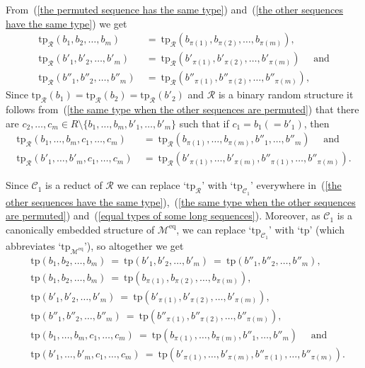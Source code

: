 \documentclass[11pt, twoside]{amsart}
\numberwithin{equation}{section}
\newcommand{\tp}{\mathrm{tp}}
\newcommand{\meq}{^{\mathrm{eq}}}
\newcommand{\mcC}{\mathcal{C}}
\newcommand{\mcM}{\mathcal{M}}
\newcommand{\mcR}{\mathcal{R}}
\begin{document}
\noindent
From~(\ref{the permuted sequence has the same type}) and~(\ref{the other sequences have the same type})
we get
\begin{align}\label{the same type when the other sequences are permuted}
\tp_\mcR(b_1, b_2, \ldots, b_m) \ &= \ \tp_\mcR(b_{\pi(1)}, b_{\pi(2)}, \ldots, b_{\pi(m)}),  \\
\tp_\mcR(b'_1, b'_2, \ldots, b'_m) \ &= \ \tp_\mcR(b'_{\pi(1)}, b'_{\pi(2)}, \ldots, b'_{\pi(m)}) \quad \text{ and} \nonumber \\
\tp_\mcR(b''_1, b''_2, \ldots, b''_m) \ &= \ \tp_\mcR(b''_{\pi(1)}, b''_{\pi(2)}, \ldots, b''_{\pi(m)}), \nonumber
\end{align}
Since $\tp_\mcR(b_1) = \tp_\mcR(b_2) = \tp_\mcR(b'_2)$ and $\mcR$ is a binary random structure it follows 
from~(\ref{the same type when the other sequences are permuted}) that there are
$c_2, \ldots, c_m \in R \setminus \{b_1, \ldots, b_m, b'_1, \ldots, b'_m\}$ such that if $c_1 = b_1 (= b'_1)$,
then
\begin{align}\label{equal types of some long sequences}
\tp_\mcR(b_1, \ldots, b_m,  c_1, \ldots, c_m)  \ &= \ \tp_\mcR(b_{\pi(1)}, \ldots, b_{\pi(m)},  b''_1, \ldots, b''_m)
\quad \text{ and} \\
\tp_\mcR(b'_1, \ldots, b'_m, c_1, \ldots, c_m) \ &= \ \tp_\mcR(b'_{\pi(1)}, \ldots, b'_{\pi(m)}, b''_{\pi(1)}, \ldots, b''_{\pi(m)}).
\nonumber
\end{align}


\noindent
Since $\mcC_1$ is a reduct of $\mcR$ we can replace `$\tp_\mcR$' with `$\tp_{\mcC_1}$' everywhere 
 in~(\ref{the other sequences have the same type}),~(\ref{the same type when the other sequences are permuted})
and~(\ref{equal types of some long sequences}).
Moreover, as $\mcC_1$ is a canonically embedded structure of $\mcM\meq$, we can replace 
`$\tp_{\mcC_1}$' with `$\tp$' (which abbreviates `$\tp_{\mcM\meq}$'), so altogether we get
\begin{align}\label{type identifications in Meq}
&\tp(b_1, b_2, \ldots, b_m) \ = \ 
\tp(b'_1, b'_2, \ldots, b'_m) \ = \ 
\tp(b''_1, b''_2, \ldots, b''_m), \\
&\tp(b_1, b_2, \ldots, b_m) \ = \ \tp(b_{\pi(1)}, b_{\pi(2)}, \ldots, b_{\pi(m)}), \nonumber \\
&\tp(b'_1, b'_2, \ldots, b'_m) \ = \ \tp(b'_{\pi(1)}, b'_{\pi(2)}, \ldots, b'_{\pi(m)}), \nonumber \\
&\tp(b''_1, b''_2, \ldots, b''_m) \ = \ \tp(b''_{\pi(1)}, b''_{\pi(2)}, \ldots, b''_{\pi(m)}), \nonumber \\
&\tp(b_1, \ldots, b_m,  c_1, \ldots, c_m)  \ = \ \tp(b_{\pi(1)}, \ldots, b_{\pi(m)},  b''_1, \ldots, b''_m)
\quad \text{ and} \nonumber \\
&\tp(b'_1, \ldots, b'_m, c_1, \ldots, c_m) \ = \ \tp(b'_{\pi(1)}, \ldots, b'_{\pi(m)}, b''_{\pi(1)}, \ldots, b''_{\pi(m)}). \nonumber
\end{align}
\end{document}
